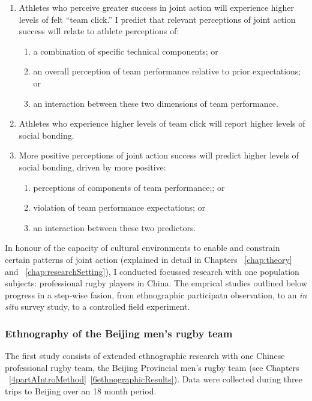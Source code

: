 \begin{CJK}{UTF8}{gbsn}
    \begin{enumerate}
      \item Athletes who perceive greater success in joint action will experience higher levels of felt ``team click.'' I predict that relevant perceptions of joint action success will relate to athlete perceptions of:
        \begin{enumerate}
          \item a combination of specific technical components; or
          \item an overall perception of team performance relative to prior expectations; or
          \item an interaction between these two dimensions of team performance.
        \end{enumerate}
      \item Athletes who experience higher levels of team click will report higher levels of social bonding.
      \item More positive perceptions of joint action success will predict higher levels of social bonding, driven by more positive:
      \begin{enumerate}
        \item perceptions of components of team performance;; or
        \item violation of team performance expectations; or
        \item an interaction between these two predictors.
      \end{enumerate}
    \end{enumerate}

In honour of the capacity of cultural environments to enable and constrain certain patterns of joint action (explained in detail in Chapters ~\ref{chap:theory} and ~\ref{chap:researchSetting}), I conducted focussed research with one population subjects: professional rugby players in China.  The emprical studies outlined below progress in a step-wise fasion, from ethnographic participatn observation, to an \textit{in situ} survey study, to a controlled field experiment.

\subsubsection{Ethnography of the Beijing men's rugby team}
  The first study consists of extended ethnographic research with one Chinese professional rugby team, the Beijing Provincial men's rugby team (see Chapters ~\ref{4partAIntroMethod}\nobreakdash~\ref{6ethnographicResults}).  Data were collected during three trips to Beijing over an 18 month period.


\end{CJK}

